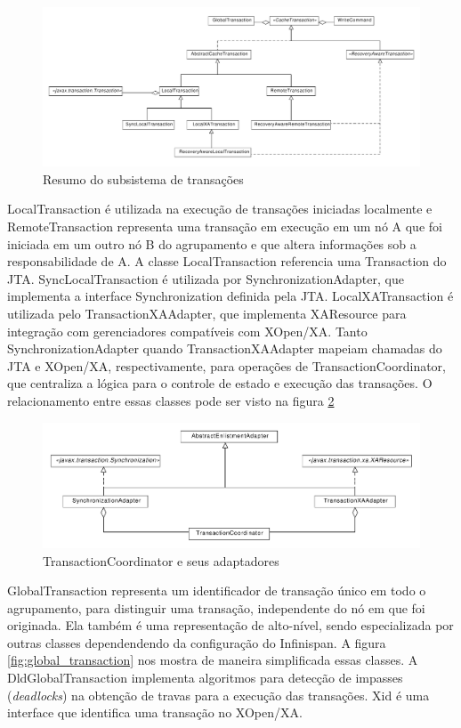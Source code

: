 \documentclass[11pt,twoside,a4paper]{book}
\begin{document}
\begin{figure}
  \centering
  \includegraphics[width=\textwidth]{subsistema_transacoes} 
  \caption{Resumo do subsistema de transações}
  \label{fig:subsistema_transacoes} 
\end{figure}

LocalTransaction é utilizada na execução de transações iniciadas localmente e RemoteTransaction representa uma transação em execução em um nó A que foi iniciada em um outro nó B do agrupamento e que altera informações sob a responsabilidade de A. A classe LocalTransaction referencia uma Transaction do JTA. SyncLocalTransaction é utilizada por SynchronizationAdapter, que implementa a interface Synchronization definida pela JTA. LocalXATransaction é utilizada pelo TransactionXAAdapter, que implementa XAResource para integração com gerenciadores compatíveis com XOpen/XA. Tanto SynchronizationAdapter quando TransactionXAAdapter mapeiam chamadas do JTA e XOpen/XA, respectivamente, para operações de TransactionCoordinator, que centraliza a lógica para o controle de estado e execução das transações. O relacionamento entre essas classes pode ser visto na figura \ref{fig:transaction_coordinator}

\begin{figure}
  \centering
  \includegraphics[width=\textwidth]{transaction_coordinator} 
  \caption{TransactionCoordinator e seus adaptadores}
  \label{fig:transaction_coordinator} 
\end{figure}

GlobalTransaction representa um identificador de transação único em todo o agrupamento, para distinguir uma transação, independente do nó em que foi originada. Ela também é uma representação de alto-nível, sendo especializada por outras classes dependendendo da configuração do Infinispan. A figura \ref{fig:global_transaction} nos mostra de maneira simplificada essas classes. A DldGlobalTransaction implementa algoritmos para detecção de impasses (\emph{deadlocks}) na obtenção de travas para a execução das transações. Xid é uma interface que identifica uma transação no XOpen/XA.
\end{document}
